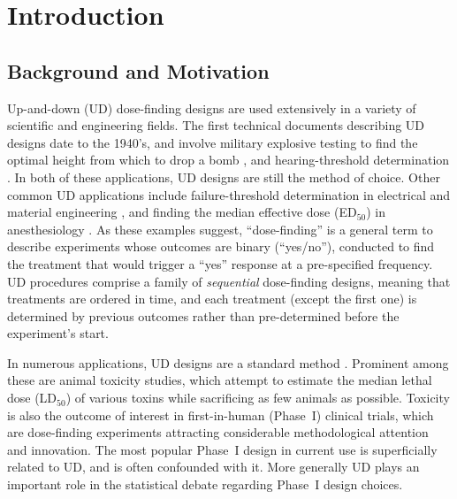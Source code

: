 

\doublespacing




\section{Introduction}\label{sec:intro}
\subsection{Background and Motivation}

Up-and-down (UD) dose-finding designs are used extensively in a variety of scientific and engineering fields. The first technical documents describing UD designs date to the 1940's, and involve military explosive testing to find the optimal height from which to drop a bomb  \citep{Ande:McCa:Tuke:Stai:1946,Dixo:Mood:Amet:1948}, and hearing-threshold determination \citep{vonB:anew:1947}. In both of these applications, UD designs are still the method of choice. Other common UD applications include failure-threshold determination in electrical and material engineering \citep{Lago:Sons:Comp:2004}, and finding the median effective dose (ED$_{50}$) in anesthesiology \citep{Pace:styl:tutor:2007}. As these examples suggest, ``dose-finding'' is a general term to describe experiments whose outcomes are binary (``yes/no''), conducted to find the treatment that would trigger a ``yes'' response at a pre-specified frequency. UD procedures comprise a family of \emph{sequential} dose-finding designs, meaning that treatments are ordered in time, and each treatment (except the first one) is determined by previous outcomes rather than pre-determined before the experiment's start.

In numerous applications, UD designs are a standard method \citep[e.g.,][]{JSME81, ASTM:Stan:1991,OECD:Revi:1998,NIEH:NIH:2001}. Prominent among these are animal toxicity studies, which attempt to estimate the median lethal dose (LD$_{50}$) of various toxins while sacrificing as few animals as possible. Toxicity is also the outcome of interest in first-in-human (Phase~I) clinical trials, which are dose-finding experiments attracting considerable methodological attention and innovation. The most popular Phase~I design in current use is superficially related to UD, and is often confounded with it. More generally UD plays an important role in the statistical debate regarding Phase~I design choices.


